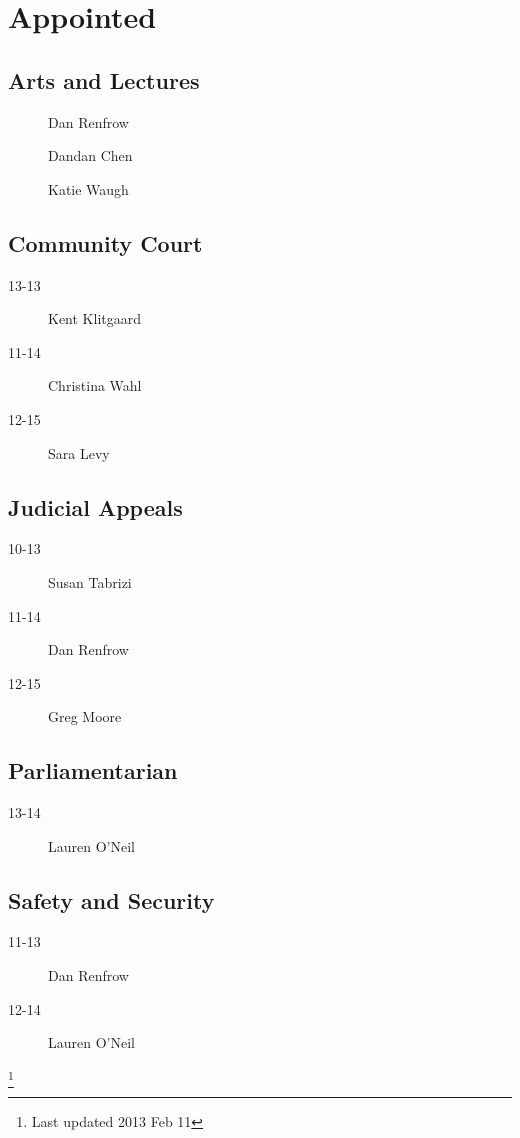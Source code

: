 \documentclass[10pt, twocolumn]{amsart}
\begin{document}
\section*{Appointed}
\subsection*{Arts and Lectures}
\begin{description}
\item[] Dan Renfrow
\item[] Dandan Chen
\item[] Katie Waugh
\end{description}

\subsection*{Community Court}
\begin{description}
\item[13-13] Kent Klitgaard
\item[11-14] Christina Wahl
\item[12-15] Sara Levy
\end{description}

\subsection*{Judicial Appeals}
\begin{description}
\item[10-13] Susan Tabrizi
\item[11-14] Dan Renfrow
\item[12-15] Greg Moore
\end{description}

\subsection*{Parliamentarian}
\begin{description}
\item[13-14] Lauren O'Neil
\end{description}

\subsection*{Safety and Security}
\begin{description}
\item[11-13] Dan Renfrow
\item[12-14] Lauren O'Neil
\end{description}





\vfill
\footnote{Last updated 2013 Feb 11}
\end{document}
